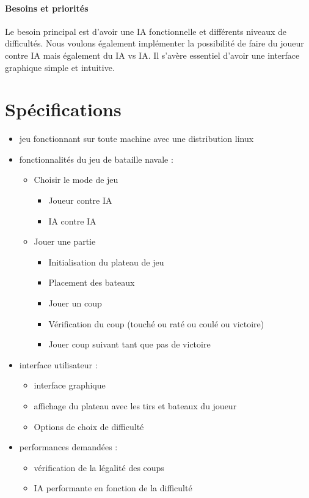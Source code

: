 \documentclass[a4paper,oneside]{article}
\begin{document}
\paragraph{Besoins et priorités\\}
Le besoin principal est d'avoir une IA fonctionnelle et différents niveaux de difficultés.
Nous voulons également implémenter la possibilité de faire du joueur contre IA mais
également du IA vs IA.
Il s'avère essentiel d'avoir une interface graphique simple et intuitive.


\newpage

\section{Spécifications}

\begin{itemize}
    \item jeu fonctionnant sur toute machine avec une distribution linux
    \item fonctionnalités du jeu de bataille navale :
        \begin{itemize}
            \item Choisir le mode de jeu
            \begin{itemize}
            	\item Joueur contre IA
            	\item IA contre IA
            \end{itemize}
            \item Jouer une partie
            \begin{itemize}
            	\item Initialisation du plateau de jeu
            	\item Placement des bateaux
            	\item Jouer un coup
            	\item Vérification du coup (touché ou raté ou coulé ou victoire)
            	\item Jouer coup suivant tant que pas de victoire
            \end{itemize}
        \end{itemize}
    \item interface utilisateur :
        \begin{itemize}
            \item interface graphique
            \item affichage du plateau avec les tirs et bateaux du joueur
            \item Options de choix de difficulté
        \end{itemize}
    \item performances demandées :
        \begin{itemize}
            \item vérification de la légalité des coups
            \item IA performante en fonction de la difficulté
        \end{itemize}
\end{itemize}
\end{document}
